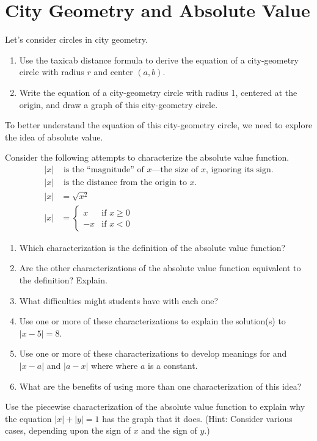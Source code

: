 \newpage

\section{City Geometry and Absolute Value}

\begin{prob}
Let's consider circles in city geometry.  
\begin{enumerate}
\item Use the taxicab distance formula to derive the equation of a city-geometry circle with radius $r$ and center $(a, b)$.  
\item Write the equation of a city-geometry circle with radius 1, centered at the origin, and draw a graph of this city-geometry circle.  
\end{enumerate}
\end{prob}

To better understand the equation of this city-geometry circle, we need to explore the idea of absolute value.  

\begin{prob}
Consider the following attempts to characterize the absolute value function.    
\begin{align}
|x| & \text{ is the ``magnitude'' of $x$---the size of $x$, ignoring its sign.} \\
|x| & \text{ is the distance from the origin to $x$.} \\
|x| & = \sqrt{x^2} \\
|x| & =
  \begin{cases}
   x    & \text{if } x \geq 0 \\
   -x   & \text{if } x < 0
  \end{cases}
\end{align}

\begin{enumerate}
\item Which characterization is the definition of the absolute value function? 
\item Are the other characterizations of the absolute value function equivalent to the definition?  Explain.  
\item What difficulties might students have with each one?  
\item Use one or more of these characterizations to explain the solution(s) to $|x-5|=8$.  
\item Use one or more of these characterizations to develop meanings for and $|x-a|$ and $|a-x|$ where where $a$ is a constant.  
\item What are the benefits of using more than one characterization of this idea?  
\end{enumerate}
\end{prob}

\begin{prob}
Use the piecewise characterization of the absolute value function to explain why the equation $|x| + |y| = 1$ has the graph that it does. (Hint:  Consider various cases, depending upon the sign of $x$ and the sign of $y$.)
\end{prob}


